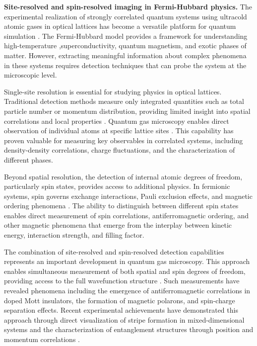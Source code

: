 



\textbf{Site-resolved and spin-resolved imaging in Fermi-Hubbard physics.}
The experimental realization of strongly correlated quantum systems using ultracold atomic gases in optical lattices has become a versatile platform for quantum simulation \cite{esslinger_fermi-hubbard_2010,gross_quantum_2017}. The Fermi-Hubbard model provides a framework for understanding high-temperature ,superconductivity, quantum magnetism, and exotic phases of matter. However, extracting meaningful information about complex phenomena in these systems requires detection techniques that can probe the system at the microscopic level.

Single-site resolution is essential for studying physics in optical lattices. Traditional detection methods measure only integrated quantities such as total particle number or momentum distribution, providing limited insight into spatial correlations and local properties \cite{gross_quantum_2021}. Quantum gas microscopy enables direct observation of individual atoms at specific lattice sites \cite{bakr_quantum_2009,sherson_single-atom-resolved_2010}. This capability has proven valuable for measuring key observables in correlated systems, including density-density correlations, charge fluctuations, and the characterization of different phases.

Beyond spatial resolution, the detection of internal atomic degrees of freedom, particularly spin states, provides access to additional physics. In fermionic systems, spin governs exchange interactions, Pauli exclusion effects, and magnetic ordering phenomena \cite{parsons_site-resolved_2016,boll_spin-_2016}. The ability to distinguish between different spin states enables direct measurement of spin correlations, antiferromagnetic ordering, and other magnetic phenomena that emerge from the interplay between kinetic energy, interaction strength, and filling factor.

The combination of site-resolved and spin-resolved detection capabilities represents an important development in quantum gas microscopy. This approach enables simultaneous measurement of both spatial and spin degrees of freedom, providing access to the full wavefunction structure \cite{mazurenko_cold-atom_2017}. Such measurements have revealed phenomena including the emergence of antiferromagnetic correlations in doped Mott insulators, the formation of magnetic polarons, and spin-charge separation effects. Recent experimental achievements have demonstrated this approach through direct visualization of stripe formation in mixed-dimensional systems \cite{bourgund_formation_2025} and the characterization of entanglement structures through position and momentum correlations \cite{bergschneider_experimental_2019}.

